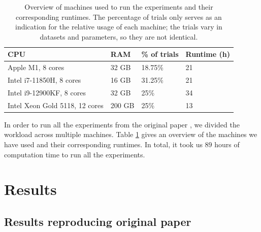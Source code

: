 \begin{table}[H]
\centering
\begin{tabular}{llll}
\toprule
CPU & RAM & \% of trials & Runtime (h)\\
\midrule
Apple M1, 8 cores              & 32 GB  & 18.75\% & 21 \\
Intel i7-11850H, 8 cores       & 16 GB  & 31.25\% & 21 \\
Intel i9-12900KF, 8 cores      & 32 GB  & 25\%    & 34 \\
Intel Xeon Gold 5118, 12 cores & 200 GB & 25\%    & 13 \\
\bottomrule
\end{tabular}
\caption{Overview of machines used to run the experiments and their corresponding runtimes. The percentage of trials only serves as an indication for the relative usage of each machine; the trials vary in datasets and parameters, so they are not identical.}
\label{table:runtime}
\end{table}

In order to run all the experiments from the original paper \cite{giguere2022}, we divided the workload across multiple machines. Table \ref{table:runtime} gives an overview of the machines we have used and their corresponding runtimes. In total, it took us $89$ hours of computation time to run all the experiments.


\section{Results}
\label{sec:results}


\subsection{Results reproducing original paper}

